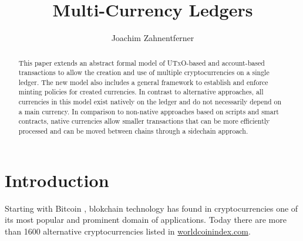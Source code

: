 \documentclass{llncs}
\newcommand{\utxo}{\textsc{UTxO}\xspace}
\begin{document}
\title{Multi-Currency Ledgers}


\author{
  Joachim Zahnentferner\\%
}




\maketitle

\begin{abstract}
This paper extends an abstract formal model of \utxo-based and account-based transactions to allow the creation and use of multiple cryptocurrencies on a single ledger. The new model also includes a general framework to establish and enforce minting policies for created currencies. In contrast to alternative approaches, all currencies in this model exist natively on the ledger and do not necessarily depend on a main currency. In comparison to non-native approaches based on scripts and smart contracts, native currencies allow smaller transactions that can be more efficiently processed and can be moved between chains through a sidechain approach.
\end{abstract}


\section{Introduction}

Starting with Bitcoin \cite{Nakamoto2008}, blokchain technology has found in cryptocurrencies one of its 
most popular and prominent domain of applications. Today there are more than 1600 alternative cryptocurrencies listed in \url{worldcoinindex.com}.
\end{document}
